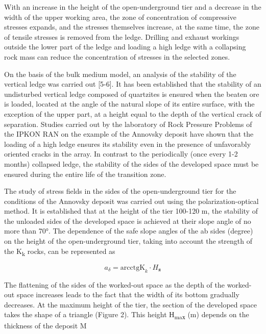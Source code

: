 \begin{multicols}{2}
With an increase in the height of the open-underground tier and a
decrease in the width of the upper working area, the zone of
concentration of compressive stresses expands, and the stresses
themselves increase, at the same time, the zone of tensile stresses is
removed from the ledge. Drilling and exhaust workings outside the lower
part of the ledge and loading a high ledge with a collapsing rock mass
can reduce the concentration of stresses in the selected zones.

On the basis of the bulk medium model, an analysis of the stability of
the vertical ledge was carried out {[}5-6{]}. It has been established
that the stability of an undisturbed vertical ledge composed of
quartzites is ensured when the beaten ore is loaded, located at the
angle of the natural slope of its entire surface, with the exception of
the upper part, at a height equal to the depth of the vertical crack of
separation. Studies carried out by the laboratory of Rock Pressure
Problems of the IPKON RAN on the example of the Annovsky deposit have
shown that the loading of a high ledge ensures its stability even in the
presence of unfavorably oriented cracks in the array. In contrast to the
periodically (once every 1-2 months) collapsed ledge, the stability of
the sides of the developed space must be ensured during the entire life
of the transition zone.

The study of stress fields in the sides of the open-underground tier for
the conditions of the Annovsky deposit was carried out using the
polarization-optical method. It is established that at the height of the
tier 100-120 m, the stability of the unloaded sides of the developed
space is achieved at their slope angle of no more than 70°. The
dependence of the safe slope angles of the ab sides (degree) on the
height of the open-underground tier, taking into account the strength of
the K\textsubscript{k} rocks, can be represented as

\begin{equation}
a_{\delta} = \text{arcctgK}_{k} \cdot H_{\text{я}}
\end{equation}

The flattening of the sides of the worked-out space as the depth of the
worked-out space increases leads to the fact that the width of its
bottom gradually decreases. At the maximum height of the tier, the
section of the developed space takes the shape of a triangle (Figure 2).
This height Н\textsubscript{maх} (m) depends on the thickness of the
deposit M


\end{multicols}
